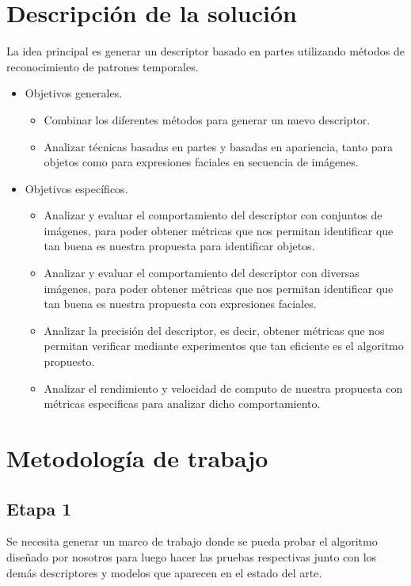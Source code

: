 \documentclass[a4paper,12pt]{article}
\begin{document}
\section{Descripción de la solución}
La idea principal es generar un descriptor basado en partes utilizando métodos de reconocimiento de patrones temporales.
\begin{itemize}
		\item Objetivos generales.
			\begin{itemize}
				\item Combinar los diferentes métodos para generar un nuevo descriptor.
				\item Analizar técnicas basadas en partes y basadas en apariencia, tanto para objetos como para expresiones faciales en secuencia de imágenes.
			\end{itemize}
		\newpage
		\item Objetivos específicos.
			\begin{itemize}
				\item Analizar y evaluar el comportamiento del descriptor con conjuntos de imágenes, para poder obtener métricas que nos permitan identificar que tan buena es nuestra propuesta para identificar objetos.
				\item Analizar y evaluar el comportamiento del descriptor con diversas imágenes, para poder obtener métricas que nos permitan identificar que tan buena es nuestra propuesta con expresiones faciales.
				\item Analizar la precisión del descriptor, es decir, obtener métricas que nos permitan verificar mediante experimentos que tan eficiente es el algoritmo propuesto.
				\item Analizar el rendimiento y velocidad de computo de nuestra propuesta con métricas especificas para analizar dicho comportamiento.
				
			\end{itemize}			

	\end{itemize}

\section{Metodología de trabajo}
\subsection{Etapa 1}
Se necesita  generar un marco de trabajo donde se pueda probar el algoritmo diseñado por nosotros para luego hacer las pruebas respectivas junto con los demás descriptores y modelos que aparecen en el estado del arte.
\end{document}
